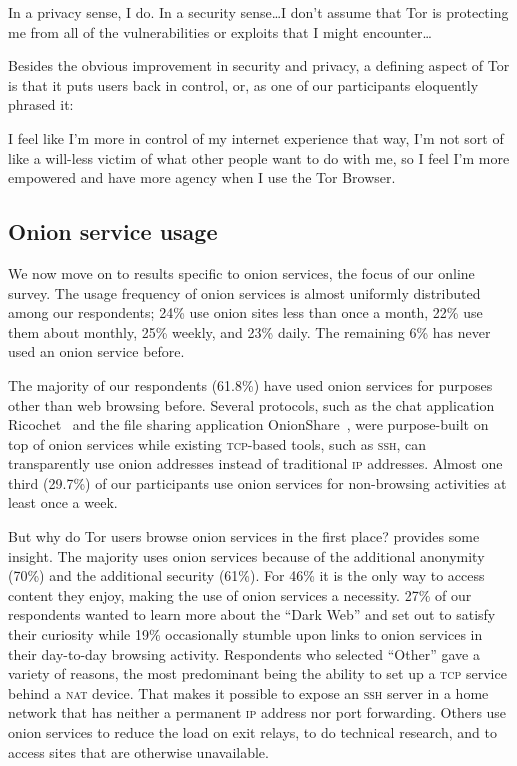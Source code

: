 \begin{displayquote}[P06]
In a privacy sense, I do. In a security sense\ldots I don't assume that Tor is
protecting me from all of the vulnerabilities or exploits that I might
encounter\ldots
\end{displayquote}

Besides the obvious improvement in security and privacy, a defining aspect of
Tor is that it puts users back in control, or, as one of our participants
eloquently phrased it:

\begin{displayquote}[P02]
I feel like I'm more in control of my internet experience that way, I'm not sort
of like a will-less victim of what other people want to do with me, so I feel
I'm more empowered and have more agency when I use the Tor Browser.
\end{displayquote}

\subsection{Onion service usage}

We now move on to results specific to onion services, the focus of our online
survey.  The usage frequency of onion services is almost uniformly distributed
among our respondents; 24\% use onion sites less than once a month, 22\% use
them about monthly, 25\% weekly, and 23\% daily.  The remaining 6\% has never
used an onion service before.

The majority of our respondents (61.8\%) have used onion services for purposes
other than web browsing before.  Several protocols, such as the chat application
Ricochet~\cite{ricochet} and the file sharing application
OnionShare~\cite{onionshare}, were purpose-built on top of onion services while
existing \textsc{tcp}-based tools, such as \textsc{ssh}, can transparently use
onion addresses instead of traditional \textsc{ip} addresses.  Almost one third
(29.7\%) of our participants use onion services for non-browsing activities at
least once a week.

But why do Tor users browse onion services in the first place?
 provides some insight.  The majority uses onion services
because of the additional anonymity (70\%) and the additional security (61\%).
For 46\% it is the only way to access content they enjoy, making the use of
onion services a necessity.  27\% of our respondents wanted to learn more about
the ``Dark Web'' and set out to satisfy their curiosity while 19\% occasionally
stumble upon links to onion services in their day-to-day browsing activity.
Respondents who selected ``Other'' gave a variety of reasons, the most
predominant being the ability to set up a \textsc{tcp} service behind a
\textsc{nat} device.  That makes it possible to expose an \textsc{ssh} server in
a home network that has neither a permanent \textsc{ip} address nor port
forwarding.  Others use onion services to reduce the load on exit relays, to do
technical research, and to access sites that are otherwise unavailable.

